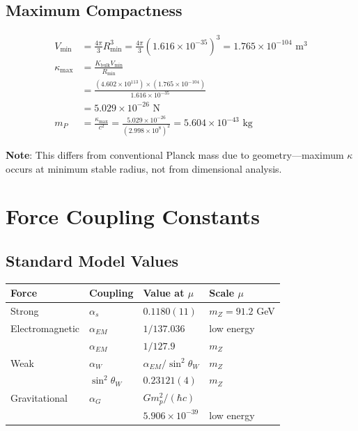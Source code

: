 \documentclass{article}
\begin{document}
\subsection{Maximum Compactness}

\begin{align}
V_{\text{min}} &= \frac{4\pi}{3} R_{\text{min}}^3 = \frac{4\pi}{3} (1.616 \times 10^{-35})^3 = 1.765 \times 10^{-104} \text{ m}^3 \\
\kappa_{\text{max}} &= \frac{K_{\text{bulk}} V_{\text{min}}}{R_{\text{min}}} \\
&= \frac{(4.602 \times 10^{113}) \times (1.765 \times 10^{-104})}{1.616 \times 10^{-35}} \\
&= 5.029 \times 10^{-26} \text{ N} \\
m_P &= \frac{\kappa_{\text{max}}}{c^2} = \frac{5.029 \times 10^{-26}}{(2.998 \times 10^8)^2} = 5.604 \times 10^{-43} \text{ kg}
\end{align}

\textbf{Note}: This differs from conventional Planck mass due to geometry—maximum $\kappa$ occurs at minimum stable radius, not from dimensional analysis.

\section{Force Coupling Constants}

\subsection{Standard Model Values}

\begin{longtable}{llll}
\toprule
\textbf{Force} & \textbf{Coupling} & \textbf{Value at $\mu$} & \textbf{Scale $\mu$} \\
\midrule
Strong & $\alpha_s$ & $0.1180(11)$ & $m_Z = 91.2$ GeV \\
Electromagnetic & $\alpha_{EM}$ & $1/137.036$ & low energy \\
& $\alpha_{EM}$ & $1/127.9$ & $m_Z$ \\
Weak & $\alpha_W$ & $\alpha_{EM}/\sin^2\theta_W$ & $m_Z$ \\
& $\sin^2\theta_W$ & $0.23121(4)$ & $m_Z$ \\
Gravitational & $\alpha_G$ & $G m_p^2/(\hbar c)$ & \\
& & $5.906 \times 10^{-39}$ & low energy \\
\bottomrule
\end{longtable}
\end{document}
